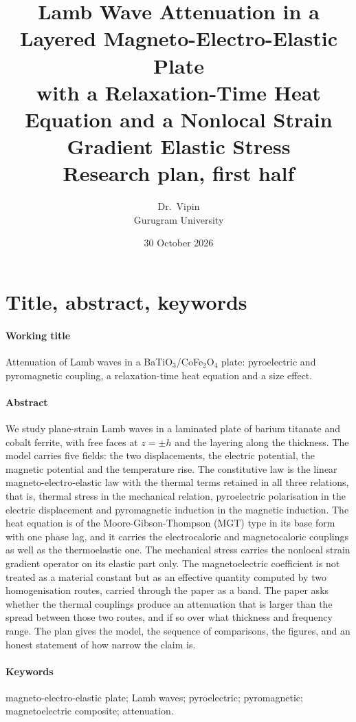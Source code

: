 \documentclass[11pt]{article}
\title{\vspace{-1.6cm}\Large Lamb Wave Attenuation in a Layered Magneto-Electro-Elastic Plate\\[2pt]
\large with a Relaxation-Time Heat Equation and a Nonlocal Strain Gradient Elastic Stress\\[8pt]
\large Research plan, first half}
\author{Dr.\ Vipin \\ Gurugram University}
\date{30 October 2026}
\begin{document}
\maketitle
\vspace{-6mm}

\section{Title, abstract, keywords}

\paragraph{Working title} Attenuation of Lamb waves in a BaTiO$_3$/CoFe$_2$O$_4$ plate: pyroelectric and
pyromagnetic coupling, a relaxation-time heat equation and a size effect.

\paragraph{Abstract} We study plane-strain Lamb waves in a laminated plate of barium titanate and cobalt
ferrite, with free faces at $z=\pm h$ and the layering along the thickness. The model carries five fields:
the two displacements, the electric potential, the magnetic potential and the temperature rise. The
constitutive law is the linear magneto-electro-elastic law with the thermal terms retained in all three
relations, that is, thermal stress in the mechanical relation, pyroelectric polarisation in the electric
displacement and pyromagnetic induction in the magnetic induction. The heat equation is of the Moore-Gibson-Thompson (MGT)
type in its base form with one phase lag, and it carries the electrocaloric and magnetocaloric
couplings as well as the thermoelastic one. The mechanical stress carries the nonlocal strain gradient
operator on its elastic part only. The magnetoelectric coefficient is not treated as a material constant but
as an effective quantity computed by two homogenisation routes, carried through the paper as a band. The
paper asks whether the thermal couplings produce an attenuation that is larger than the spread between those
two routes, and if so over what thickness and frequency range. The plan gives the model, the sequence of
comparisons, the figures, and an honest statement of how narrow the claim is.

\paragraph{Keywords} magneto-electro-elastic plate; Lamb waves; pyroelectric; pyromagnetic; magnetoelectric
composite; attenuation.
\end{document}
